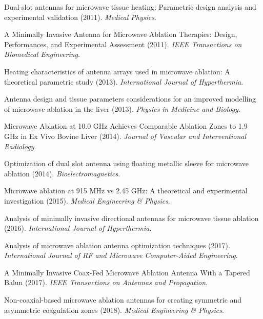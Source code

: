 \documentclass[12pt, a4paper]{article}
\begin{document}
\begin{enumerate}[label={[\arabic*]}]
    \item Dual-slot antennas for microwave tissue heating: Parametric design analysis and experimental validation (2011). \textit{Medical Physics}.

    \item A Minimally Invasive Antenna for Microwave Ablation Therapies: Design, Performances, and Experimental Assessment (2011). \textit{IEEE Transactions on Biomedical Engineering}.

    \item Heating characteristics of antenna arrays used in microwave ablation: A theoretical parametric study (2013). \textit{International Journal of Hyperthermia}.

    \item Antenna design and tissue parameters considerations for an improved modelling of microwave ablation in the liver (2013). \textit{Physics in Medicine and Biology}.

    \item Microwave Ablation at 10.0 GHz Achieves Comparable Ablation Zones to 1.9 GHz in Ex Vivo Bovine Liver (2014). \textit{Journal of Vascular and Interventional Radiology}.

    \item Optimization of dual slot antenna using floating metallic sleeve for microwave ablation (2014). \textit{Bioelectromagnetics}.

    \item Microwave ablation at 915 MHz vs 2.45 GHz: A theoretical and experimental investigation (2015). \textit{Medical Engineering \& Physics}.

    \item Analysis of minimally invasive directional antennas for microwave tissue ablation (2016). \textit{International Journal of Hyperthermia}.

    \item Analysis of microwave ablation antenna optimization techniques (2017). \textit{International Journal of RF and Microwave Computer-Aided Engineering}.

    \item A Minimally Invasive Coax-Fed Microwave Ablation Antenna With a Tapered Balun (2017). \textit{IEEE Transactions on Antennas and Propagation}.

    \item Non-coaxial-based microwave ablation antennas for creating symmetric and asymmetric coagulation zones (2018). \textit{Medical Engineering \& Physics}.


\end{enumerate}
\end{document}
